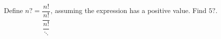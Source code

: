 Define $n?=\dfrac{n!}{\dfrac{n!}{\dfrac{n!}{\ddots}}}$, assuming the expression has a positive value. Find $5?$.
